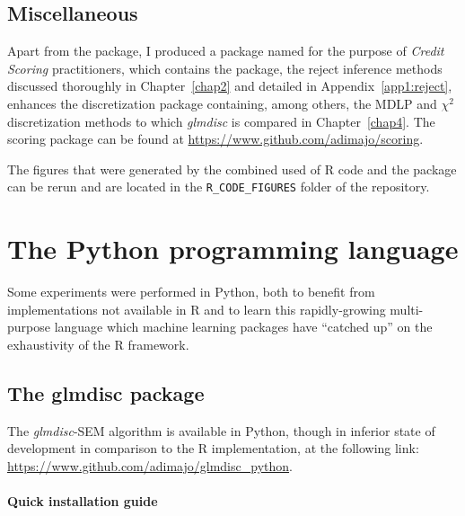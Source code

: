 \subsection{Miscellaneous}

Apart from the  package, I produced a package named  for the purpose of \textit{Credit Scoring} practitioners, which contains the  package, the reject inference methods discussed thoroughly in Chapter~\ref{chap2} and detailed in Appendix~\ref{app1:reject}, enhances the discretization package containing, among others, the MDLP and $\chi^2$ discretization methods to which \textit{glmdisc} is compared in Chapter~\ref{chap4}.
The scoring package can be found at \url{https://www.github.com/adimajo/scoring}.

The figures that were generated by the combined used of \textsf{R} code and the  package can be rerun and are located in the \verb|R_CODE_FIGURES| folder of the repository.

\section{The Python programming language}

Some experiments were performed in Python, both to benefit from implementations not available in \textsf{R} and to learn this rapidly-growing multi-purpose language which machine learning packages have ``catched up'' on the exhaustivity of the \textsf{R} framework.

\subsection{The glmdisc package}

The \textit{glmdisc}-SEM algorithm is available in Python, though in inferior state of development in comparison to the \textsf{R} implementation, at the following link: \url{https://www.github.com/adimajo/glmdisc_python}.

\paragraph{Quick installation guide}

